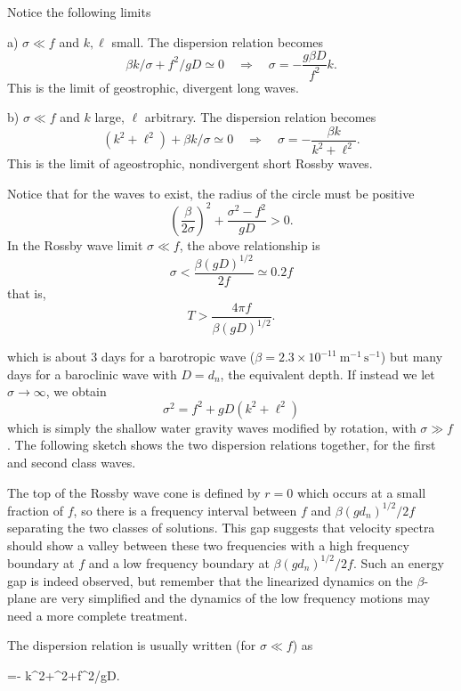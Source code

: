 Notice the following limits

\noindent a) $\sigma\ll f$ and $k,\ell$ small. The dispersion relation becomes
\[
	\beta k/\sigma+f^2/gD\simeq0
	\quad\Rightarrow\quad
	\sigma=-\frac{g\beta D}{f^2}k.
\]
This is the limit of geostrophic, divergent long waves.

\noindent b) $\sigma\ll f$ and $k$ large, $\ell$ arbitrary. The dispersion relation
becomes
\[
	(k^2+\ell^2)+\beta k/\sigma\simeq0
	\quad\Rightarrow\quad
	\sigma=-\frac{\beta k}{k^2+\ell^2}.
\]
This is the limit of ageostrophic, nondivergent short Rossby waves.

Notice that for the waves to exist, the radius of the circle must be positive
\[
	\left(\frac{\beta}{2\sigma}\right)^2
	+\frac{\sigma^2-f^2}{gD}>0.
\]
In the Rossby wave limit $\sigma\ll f$, the above relationship is
\[
	\sigma<\frac{\beta(gD)^{1/2}}{2f}\simeq0.2f
\]
that is,
\[
	T>\frac{4\pi f}{\beta(gD)^{1/2}}.
\]

\sourcepagebreak

which is about 3 days for a barotropic wave
($\beta=2.3\times10^{-11}\ \mathrm{m^{-1}\,s^{-1}}$) but many days for a baroclinic
wave with $D=d_n$, the equivalent depth. If instead we let $\sigma\to\infty$, we obtain
\[
	\sigma^2=f^2+gD(k^2+\ell^2)
\]
which is simply the shallow water gravity waves modified by rotation, with
$\sigma\gg f$. The following sketch shows the two dispersion relations together, for
the first and second class waves.


The top of the Rossby wave cone is defined by $r=0$ which occurs at a small fraction of
$f$, so there is a frequency interval between $f$ and
$\beta(gd_n)^{1/2}/2f$ separating the two classes of solutions. This gap suggests that
velocity spectra should show a valley between these two frequencies with a high
frequency boundary at $f$ and a low frequency boundary at
$\beta(gd_n)^{1/2}/2f$. Such an energy gap is indeed observed, but remember that the
linearized dynamics on the $\beta$-plane are very simplified and the dynamics of the
low frequency motions may need a more complete treatment.

The dispersion relation is usually written (for $\sigma\ll f$) as
\begin{waveequation}
	\sigma=-
	{k^2+\ell^2+f^2/gD}.
\end{waveequation}

